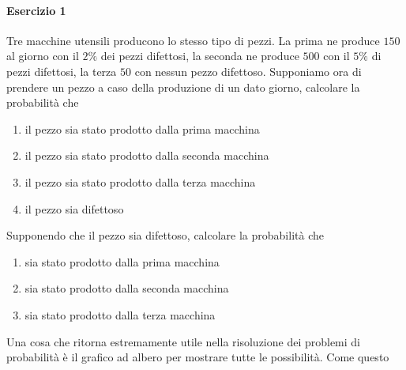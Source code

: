 \paragraph{Esercizio 1}
Tre macchine utensili producono lo stesso tipo di pezzi. La prima ne produce $150$ al giorno con il 
$2\%$ dei pezzi difettosi, la seconda ne produce $500$ con il $5\%$ di pezzi difettosi, la terza
$50$ con nessun pezzo difettoso. Supponiamo ora di prendere un pezzo a caso della produzione di un 
dato giorno, calcolare la probabilità che
\begin{enumerate}
  \item il pezzo sia stato prodotto dalla prima macchina
  \item il pezzo sia stato prodotto dalla seconda macchina
  \item il pezzo sia stato prodotto dalla terza macchina
  \item il pezzo sia difettoso
\end{enumerate}
Supponendo che il pezzo sia difettoso, calcolare la probabilità che
\begin{enumerate}
  \item sia stato prodotto dalla prima macchina
  \item sia stato prodotto dalla seconda macchina
  \item sia stato prodotto dalla terza macchina
\end{enumerate}
\divisor

Una cosa che ritorna estremamente utile nella risoluzione dei problemi di probabilità è il grafico ad
albero per mostrare tutte le possibilità. Come questo

\begin{center}
\end{center} 

